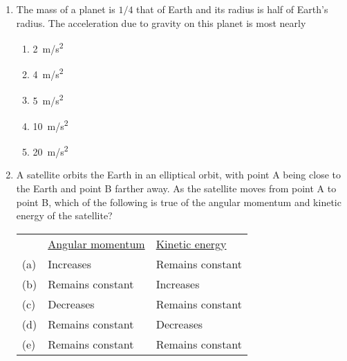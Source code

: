 \documentclass{../../oss-apphys}
\begin{document}
\begin{multicols}{2}
\begin{enumerate}[leftmargin=18pt,start=8]
  \item The mass of a planet is $1/4$ that of Earth and its radius is half of
    Earth's radius. The acceleration due to gravity on this planet is most
    nearly
    \begin{enumerate}[noitemsep,topsep=0pt,leftmargin=18pt]
    \item\SI{2 }{m/s^2}
    \item\SI{4 }{m/s^2}
    \item\SI{5 }{m/s^2}
    \item\SI{10}{m/s^2}
    \item\SI{20}{m/s^2}
    \end{enumerate}
  
  \item A satellite orbits the Earth in an elliptical orbit, with point A being
    close to the Earth and point B farther away. As the satellite moves from
    point A to point B, which of the following is true of the angular momentum
    and kinetic energy of the satellite?
    \begin{center}
      \vspace{-.1in}
    \end{center}
  
    \begin{tabular}{lll}
      & \underline{Angular momentum} & \underline{Kinetic energy}\\
      (a) & Increases & Remains constant \\
      (b) & Remains constant & Increases \\
      (c) & Decreases & Remains constant \\
      (d) & Remains constant & Decreases \\
      (e) & Remains constant & Remains constant
    \end{tabular}


\end{enumerate}
\end{multicols}
\end{document}
